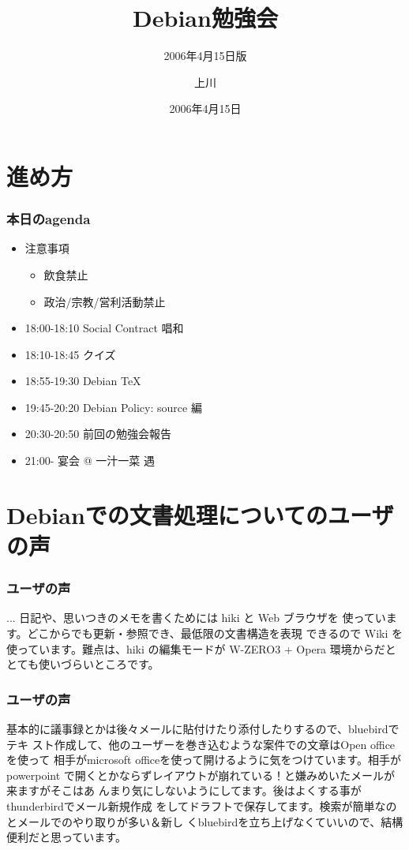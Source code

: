 \documentclass[cjk,dvipdfmx]{beamer}
\title[Debian 勉強会]{Debian勉強会}
\subtitle{2006年4月15日版}
\author{上川}
\date{2006年4月15日}
\begin{document}
\frame{\titlepage{}}

\section{進め方}
\begin{frame}
 \frametitle{本日のagenda}
\begin{itemize}
 \item 注意事項
       \begin{itemize}
	\item 飲食禁止
	\item 政治/宗教/営利活動禁止
       \end{itemize}
 \item 18:00-18:10 Social Contract 唱和
 \item 18:10-18:45 クイズ
 \item 18:55-19:30 Debian TeX
 \item 19:45-20:20 Debian Policy: source 編
 \item 20:30-20:50 前回の勉強会報告
 \item 21:00- 宴会 @ 一汁一菜 遇
\end{itemize}

\end{frame}

\section{Debianでの文書処理についてのユーザの声}

\begin{frame}
 \frametitle{ユーザの声}
... 日記や、思いつきのメモを書くためには hiki と Web ブラウザを
使っています。どこからでも更新・参照でき、最低限の文書構造を表現
できるので Wiki を使っています。難点は、hiki の編集モードが
W-ZERO3 + Opera 環境からだととても使いづらいところです。
\end{frame}

\begin{frame}
 \frametitle{ユーザの声}
基本的に議事録とかは後々メールに貼付けたり添付したりするので、bluebirdでテキ
スト作成して、他のユーザーを巻き込むような案件での文章はOpen officeを使って
相手がmicrosoft officeを使って開けるように気をつけています。相手がpowerpoint
で開くとかならずレイアウトが崩れている！と嫌みめいたメールが来ますがそこはあ
んまり気にしないようにしてます。後はよくする事がthunderbirdでメール新規作成
をしてドラフトで保存してます。検索が簡単なのとメールでのやり取りが多い＆新し
くbluebirdを立ち上げなくていいので、結構便利だと思っています。
\end{frame}
\end{document}
